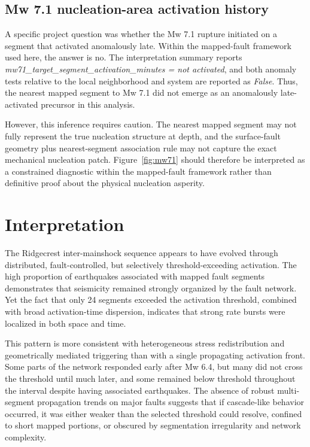 \documentclass[11pt]{article}
\begin{document}
\subsection{Mw 7.1 nucleation-area activation history}
A specific project question was whether the Mw 7.1 rupture initiated on a segment that activated anomalously late. Within the mapped-fault framework used here, the answer is no. The interpretation summary reports \emph{mw71\_target\_segment\_activation\_minutes = not activated}, and both anomaly tests relative to the local neighborhood and system are reported as \emph{False}. Thus, the nearest mapped segment to Mw 7.1 did not emerge as an anomalously late-activated precursor in this analysis.

However, this inference requires caution. The nearest mapped segment may not fully represent the true nucleation structure at depth, and the surface-fault geometry plus nearest-segment association rule may not capture the exact mechanical nucleation patch. Figure~\ref{fig:mw71} should therefore be interpreted as a constrained diagnostic within the mapped-fault framework rather than definitive proof about the physical nucleation asperity.

\section{Interpretation}
The Ridgecrest inter-mainshock sequence appears to have evolved through distributed, fault-controlled, but selectively threshold-exceeding activation. The high proportion of earthquakes associated with mapped fault segments demonstrates that seismicity remained strongly organized by the fault network. Yet the fact that only 24 segments exceeded the activation threshold, combined with broad activation-time dispersion, indicates that strong rate bursts were localized in both space and time.

This pattern is more consistent with heterogeneous stress redistribution and geometrically mediated triggering than with a single propagating activation front. Some parts of the network responded early after Mw 6.4, but many did not cross the threshold until much later, and some remained below threshold throughout the interval despite having associated earthquakes. The absence of robust multi-segment propagation trends on major faults suggests that if cascade-like behavior occurred, it was either weaker than the selected threshold could resolve, confined to short mapped portions, or obscured by segmentation irregularity and network complexity.
\end{document}

